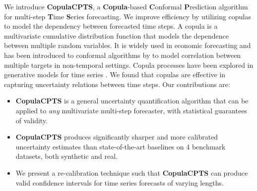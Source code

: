 We introduce  \textbf{CopulaCPTS}, a \textbf{Copula}-based \textbf{C}onformal \textbf{P}rediction algorithm for multi-step \textbf{T}ime \textbf{S}eries forecasting. We improve efficiency by utilizing copulas to model the dependency between forecasted time steps. 
A copula is a multivariate cumulative distribution function that models the dependence between multiple random variables. It is widely used in economic forecasting \cite{nelsen2007introduction, patton2012review} and has been introduced to conformal algorithms by \cite{messoudi2021copula} to model correlation between multiple targets in non-temporal settings. Copula processes have been explored in generative models for time series \cite{salinas2019high, drouin2022tactis}. We found that copulas are effective in capturing uncertainty relations between time steps. Our contributions are: 
\begin{itemize}
    \item \textbf{CopulaCPTS} is a general uncertainty quantification algorithm that can be applied to \textit{any} multivariate  multi-step forecaster, with statistical guarantees of validity.
    \item \textbf{CopulaCPTS} produces significantly sharper and more calibrated uncertainty estimates than state-of-the-art baselines on 4 benchmark datasets, both synthetic and real.
    \item We present a re-calibration technique such that \textbf{CopulaCPTS} can produce valid confidence intervals for time series forecasts of varying lengths. 
\end{itemize}


